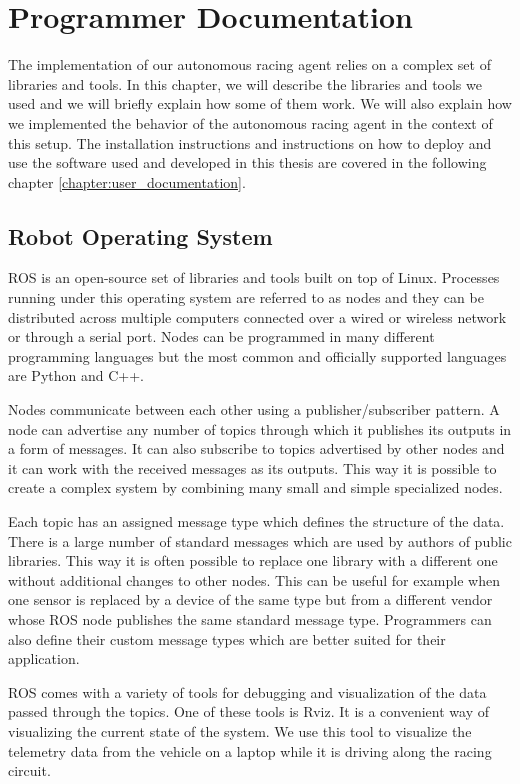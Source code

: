 \chapter{Programmer Documentation}

The implementation of our autonomous racing agent relies on a complex set of libraries and tools. In this chapter, we will describe the libraries and tools we used and we will briefly explain how some of them work. We will also explain how we implemented the behavior of the autonomous racing agent in the context of this setup. The installation instructions and instructions on how to deploy and use the software used and developed in this thesis are covered in the following chapter \ref{chapter:user_documentation}.

\section{Robot Operating System}

\gls{ROS} is an open-source set of libraries and tools built on top of Linux. Processes running under this operating system are referred to as nodes and they can be distributed across multiple computers connected over a wired or wireless network or through a serial port. Nodes can be programmed in many different programming languages but the most common and officially supported languages are Python and C++.

Nodes communicate between each other using a publisher/subscriber pattern. A node can advertise any number of topics through which it publishes its outputs in a form of messages. It can also subscribe to topics advertised by other nodes and it can work with the received messages as its outputs. This way it is possible to create a complex system by combining many small and simple specialized nodes.

Each topic has an assigned message type which defines the structure of the data. There is a large number of standard messages which are used by authors of public libraries. This way it is often possible to replace one library with a different one without additional changes to other nodes. This can be useful for example when one sensor is replaced by a device of the same type but from a different vendor whose \gls*{ROS} node publishes the same standard message type. Programmers can also define their custom message types which are better suited for their application.

\gls*{ROS} comes with a variety of tools for debugging and visualization of the data passed through the topics. One of these tools is Rviz. It is a convenient way of visualizing the current state of the system. We use this tool to visualize the telemetry data from the vehicle on a laptop while it is driving along the racing circuit.

